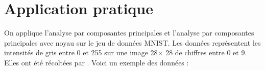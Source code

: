 \section{Application pratique}

On applique l'analyse par composantes principales et l'analyse par composantes principales avec noyau sur le jeu de données MNIST. Les données représentent les intensités de gris entre 0 et 255 sur une image 28$\times$ 28 de chiffres entre 0 et 9. Elles ont été récoltées par \cite{lecun1998gradient}. Voici un exemple des données : 

